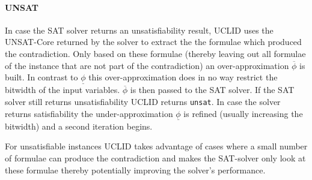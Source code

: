 \paragraph{UNSAT} In case the SAT solver returns an unsatisfiability result, \textsc{UCLID} uses the UNSAT-Core returned by the solver to extract the the formulae which produced the contradiction. Only based on these formulae (thereby leaving out all formulae of the instance that are not part of the contradiction) an over-approximation $\overline{\phi}$ is built. In contrast to $\underline{\phi}$ this over-approximation does in no way restrict the bitwidth of the input variables. $\overline{\phi}$ is then passed to the SAT solver. If the SAT solver still returns unsatisfiability \textsc{UCLID} returns \texttt{unsat}. In case the solver returns satisfiability the under-approximation $\underline{\phi}$ is refined (usually increasing the bitwidth) and a second iteration begins.
\par
For unsatisfiable instances \textsc{UCLID} takes advantage of cases where a small number of formulae can produce the contradiction and makes the SAT-solver only look at these formulae thereby potentially improving the solver's performance.
